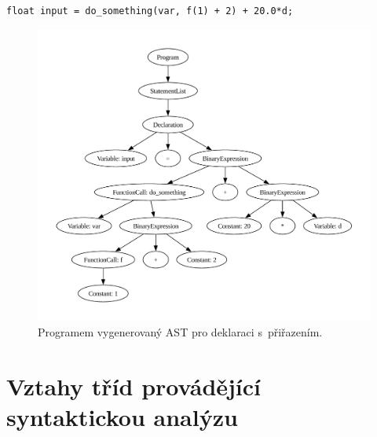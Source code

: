 \begin{lstlisting}[language=Koubp]
    float input = do_something(var, f(1) + 2) + 20.0*d;
\end{lstlisting}
\begin{figure}[h]
    \centering
    \includegraphics[width=\textwidth]{obrazky-figures/tree_deklarace.pdf}
    \caption{Programem vygenerovaný AST pro deklaraci s~přiřazením.}
    \label{fig_ast_declaration}
\end{figure}


\chapter{Vztahy tříd provádějící syn\-tak\-tic\-kou analýzu}\label{kap_priloha_b}

